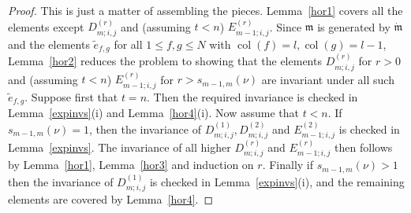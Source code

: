\documentclass[twoside,12pt,reqno]{amsart}
\def\col{\operatorname{col}}
\begin{document}
\begin{proof}
This is just a matter of assembling the pieces.
Lemma~\ref{hor1} covers all the elements except
$D_{m;i,j}^{(r)}$
and (assuming $t < n$) $E_{m-1;i,j}^{(r)}$.
Since $\mathfrak{m}$ is generated by
$\dot{\mathfrak{m}}$ and the elements
$\tilde e_{f,g}$ for all $1 \leq f,g \leq N$ with
$\col(f) = l, \col(g) = l-1$,
Lemma~\ref{hor2} reduces the problem to showing that
the elements $D_{m;i,j}^{(r)}$ for $r> 0$ and (assuming $t < n$)
$E_{m-1;i,j}^{(r)}$ for $r > s_{m-1,m}(\nu)$ 
are invariant under all such $\tilde e_{f,g}$.
Suppose first that $t=n$. 
Then the required invariance is checked in Lemma~\ref{expinvs}(i)
and Lemma~\ref{hor4}(i).
Now assume that $t < n$.
If $s_{m-1,m}(\nu) = 1$, then
the invariance of $D_{m;i,j}^{(1)},
D_{m;i,j}^{(2)}$ and $E_{m-1;i,j}^{(2)}$ is checked in
Lemma~\ref{expinvs}.
The invariance of all higher
$D_{m;i,j}^{(r)}$ and 
$E_{m-1;i,j}^{(r)}$ then follows
by Lemma~\ref{hor1}, Lemma~\ref{hor3} and induction on $r$.
Finally if $s_{m-1,m}(\nu) > 1$ then the invariance
of $D_{m;i,j}^{(1)}$ is checked in Lemma~\ref{expinvs}(i), and 
the remaining elements are covered by Lemma~\ref{hor4}.
\end{proof}
\end{document}
